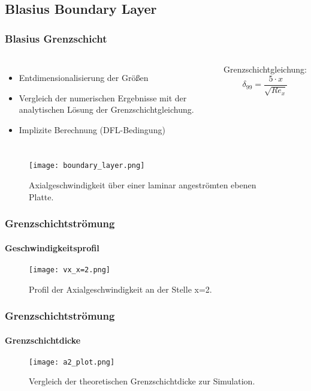 \documentclass[
	11pt, %
	aspectratio=169, %
]{beamer}
\begin{document}

\subsection{Blasius Boundary Layer}
\begin{frame}
	\frametitle{Blasius Grenzschicht}
	
	\begin{columns}

		\begin{itemize}
			\item Entdimensionalisierung der Größen
			\item Vergleich der numerischen Ergebnisse mit der analytischen Lösung der Grenzschichtgleichung.
			\item Implizite Berechnung (DFL-Bedingung)
		\end{itemize}
	Grenzschichtgleichung:
	\begin{equation}
		\delta_{99} = \frac{5 \cdot x}{\sqrt{Re_x}}
	\end{equation}
	\end{columns}
	



	\begin{center}
		\begin{figure}
			\texttt{[image: boundary\_layer.png]}
			\caption{Axialgeschwindigkeit über einer laminar angeströmten ebenen Platte.}
		\end{figure}
	\end{center}
\end{frame}

\begin{frame}
	\frametitle{Grenzschichtströmung}
	\framesubtitle{Geschwindigkeitsprofil}
	\begin{center}
		\begin{figure}
			\texttt{[image: vx\_x=2.png]}
			\caption{Profil der Axialgeschwindigkeit an der Stelle x=2.}
		\end{figure}
	\end{center}
\end{frame}

\begin{frame}
	\frametitle{Grenzschichtströmung}
	\framesubtitle{Grenzschichtdicke}
	\begin{center}
		\begin{figure}
			\texttt{[image: a2\_plot.png]}
			\caption{Vergleich der theoretischen Grenzschichtdicke zur Simulation.}
		\end{figure}
	\end{center}
\end{frame}
\end{document}
